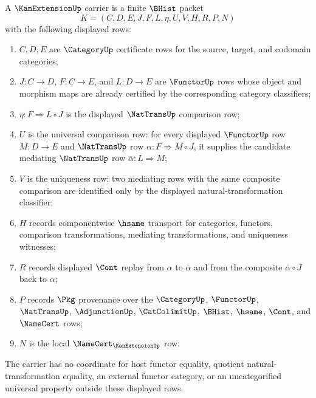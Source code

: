 \begin{definition}
\label{def:kan-extension-carrier}
A $\KanExtensionUp$ carrier is a finite $\BHist$ packet
$$
K=(C,D,E,J,F,L,\eta,U,V,H,R,P,N)
$$
with the following displayed rows:
\begin{enumerate}
\item $C,D,E$ are $\CategoryUp$ certificate rows for the source, target, and codomain categories;
\item $J:C\to D$, $F:C\to E$, and $L:D\to E$ are $\FunctorUp$ rows whose object and morphism maps are already certified by the corresponding category classifiers;
\item $\eta:F\Rightarrow L\circ J$ is the displayed $\NatTransUp$ comparison row;
\item $U$ is the universal comparison row: for every displayed $\FunctorUp$ row $M:D\to E$ and $\NatTransUp$ row $\alpha:F\Rightarrow M\circ J$, it supplies the candidate mediating $\NatTransUp$ row $\overline{\alpha}:L\Rightarrow M$;
\item $V$ is the uniqueness row: two mediating rows with the same composite comparison are identified only by the displayed natural-transformation classifier;
\item $H$ records componentwise $\hsame$ transport for categories, functors, comparison transformations, mediating transformations, and uniqueness witnesses;
\item $R$ records displayed $\Cont$ replay from $\alpha$ to $\overline{\alpha}$ and from the composite $\overline{\alpha}\circ J$ back to $\alpha$;
\item $P$ records $\Pkg$ provenance over the $\CategoryUp$, $\FunctorUp$, $\NatTransUp$, $\AdjunctionUp$, $\CatColimitUp$, $\BHist$, $\hsame$, $\Cont$, and $\NameCert$ rows;
\item $N$ is the local $\NameCert_{\KanExtensionUp}$ row.
\end{enumerate}
The carrier has no coordinate for host functor equality, quotient natural-transformation equality, an external functor category, or an uncategorified universal property outside these displayed rows.
\end{definition}

